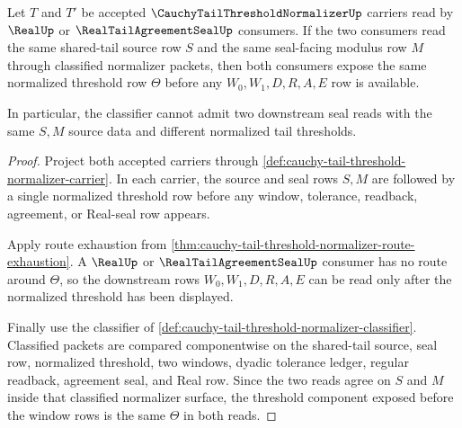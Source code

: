 \begin{theorem}
\label{thm:cauchy-tail-threshold-normalizer-shared-threshold-uniqueness}
Let $T$ and $T'$ be accepted $\CauchyTailThresholdNormalizerUp$ carriers read by $\RealUp$ or $\RealTailAgreementSealUp$ consumers. If the two consumers read the same shared-tail source row $S$ and the same seal-facing modulus row $M$ through classified normalizer packets, then both consumers expose the same normalized threshold row $\Theta$ before any $W_0,W_1,D,R,A,E$ row is available.

In particular, the classifier cannot admit two downstream seal reads with the same $S,M$ source data and different normalized tail thresholds.
\end{theorem}
\begin{proof}
Project both accepted carriers through \autoref{def:cauchy-tail-threshold-normalizer-carrier}. In each carrier, the source and seal rows $S,M$ are followed by a single normalized threshold row before any window, tolerance, readback, agreement, or Real-seal row appears.

Apply route exhaustion from \autoref{thm:cauchy-tail-threshold-normalizer-route-exhaustion}. A $\RealUp$ or $\RealTailAgreementSealUp$ consumer has no route around $\Theta$, so the downstream rows $W_0,W_1,D,R,A,E$ can be read only after the normalized threshold has been displayed.

Finally use the classifier of \autoref{def:cauchy-tail-threshold-normalizer-classifier}. Classified packets are compared componentwise on the shared-tail source, seal row, normalized threshold, two windows, dyadic tolerance ledger, regular readback, agreement seal, and Real row. Since the two reads agree on $S$ and $M$ inside that classified normalizer surface, the threshold component exposed before the window rows is the same $\Theta$ in both reads.
\end{proof}

